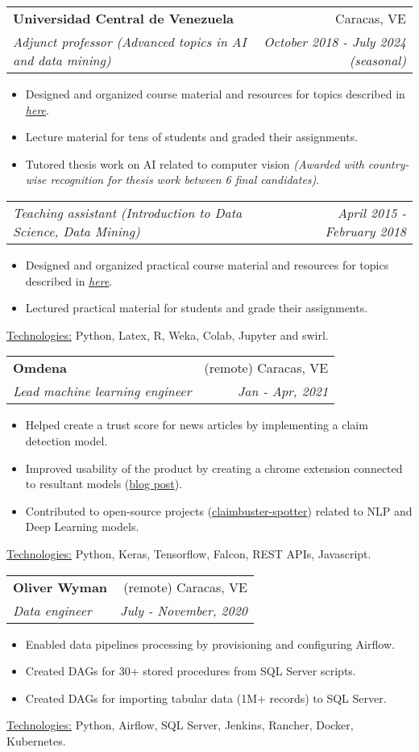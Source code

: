 \documentclass[letterpaper,11pt]{article}
\makeatletter
\newcommand{\sepsection}{\vspace{25pt}}
\newcommand{\resumeItem}[1]{%
  \item\small{
    #1
  }
}
\newcommand{\resumeSubheading}[4]{
  \vspace{8pt}\item%
    \begin{tabular*}{0.97\textwidth}[t]{l@{\extracolsep{\fill}}r}
      \textbf{#1} & #2 \\
      \textit{\small#3} & \textit{\small #4} \\
    \end{tabular*}\vspace{-5pt}
}
\newcommand{\resumeSubSubheading}[2]{
    \vspace{1pt}
    \begin{tabular*}{0.97\textwidth}{l@{\extracolsep{\fill}}r}
      \textit{\small#1} & \textit{\small #2} \\
    \end{tabular*}\vspace{-5pt}
}
\newcommand{\resumeItemListStart}{\begin{itemize}}
\newcommand{\resumeItemListEnd}{\end{itemize}\vspace{-5pt}}
\newcommand{\resumeTech}[2]{
 \underline{#1:} #2
}
\makeatother
\begin{document}
    \resumeSubheading
      {Universidad Central de Venezuela}{Caracas, VE}
      {Adjunct professor (Advanced topics in AI and data mining)}{October 2018 - July 2024 (seasonal)}
      \resumeItemListStart
      \resumeItem{Designed and organized course material and resources for topics described in \href{https://github.com/ucvia}{\textsl{here}}.}
      \resumeItem{Lecture material for tens of students and graded their assignments.}
      \resumeItem{Tutored thesis work on AI related to computer vision \newline \textsl{(Awarded with country-wise recognition for thesis work between 6 final candidates)}.}
      \resumeItemListEnd
    \resumeSubSubheading
      {Teaching assistant (Introduction to Data Science, Data Mining)}{April 2015 - February 2018}
     \resumeItemListStart
      \resumeItem{Designed and organized practical course material and resources for topics described in \href{https://github.com/ucvia}{\textsl{here}}.}
      \resumeItem{Lectured practical material for students and grade their assignments.}
      \resumeItemListEnd
      \resumeTech{Technologies}{Python, Latex, R, Weka, Colab, Jupyter and swirl.}\\

    \resumeSubheading
      {Omdena}{(remote) Caracas, VE}
      {Lead machine learning engineer}{Jan - Apr, 2021}
      \resumeItemListStart
      \resumeItem{Helped create a trust score for news articles by implementing a claim detection model.}
      \resumeItem{Improved usability of the product by creating a chrome extension connected to resultant models (\href{https://www.omdena.com/blog/fighting-misinformation}{blog post}).}
      \resumeItem{Contributed to open-source projects (\href{https://github.com/utaresearch/claimbuster-spotter}{claimbuster-spotter}) related to NLP and Deep Learning models.}
      \resumeItemListEnd
      \resumeTech{Technologies}{Python, Keras, Tensorflow, Falcon, REST APIs, Javascript.}\\

\sepsection
    \resumeSubheading
      {Oliver Wyman}{(remote) Caracas, VE}
      {Data engineer}{July - November, 2020}
      \resumeItemListStart
      \resumeItem{Enabled data pipelines processing by provisioning and configuring Airflow.}
      \resumeItem{Created DAGs for 30+ stored procedures from SQL Server scripts.}
      \resumeItem{Created DAGs for importing tabular data (1M+ records) to SQL Server.}
      \resumeItemListEnd
      \resumeTech{Technologies}{Python, Airflow, SQL Server, Jenkins, Rancher, Docker, Kubernetes.}\\
\end{document}
